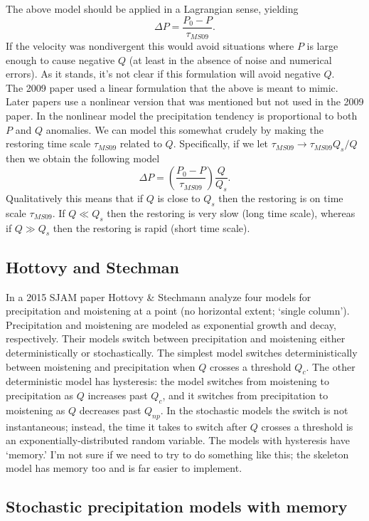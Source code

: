\documentclass[10pt]{article}
\begin{document}
The above model should be applied in a Lagrangian sense, yielding
\[\Delta P = \frac{P_0-P}{\tau_{MS09}}.\]
If the velocity was nondivergent this would avoid situations where $P$ is large enough to cause negative $Q$ (at least in the absence of noise and numerical errors).
As it stands, it's not clear if this formulation will avoid negative $Q$.\\

The 2009 paper used a linear formulation that the above is meant to mimic. 
Later papers use a nonlinear version that was mentioned but not used in the 2009 paper.
In the nonlinear model the precipitation tendency is proportional to both $P$ and $Q$ anomalies.
We can model this somewhat crudely by making the restoring time scale $\tau_{MS09}$ related to $Q$.
Specifically, if we let $\tau_{MS09}\to \tau_{MS09}Q_s/Q$ then we obtain the following model
\[\Delta P = \left(\frac{P_0-P}{\tau_{MS09}}\right)\frac{Q}{Q_s}.\]
Qualitatively this means that if $Q$ is close to $Q_s$ then the restoring is on time scale $\tau_{MS09}$.
If $Q\ll Q_s$ then the restoring is very slow (long time scale), whereas if $Q\gg Q_s$ then the restoring is rapid (short time scale).

\subsection{Hottovy and Stechman}
In a 2015 SJAM paper Hottovy \& Stechmann analyze four models for precipitation and moistening at a point (no horizontal extent; `single column').
Precipitation and moistening are modeled as exponential growth and decay, respectively.
Their models switch between precipitation and moistening either deterministically or stochastically.
The simplest model switches deterministically between moistening and precipitation when $Q$ crosses a threshold $Q_c$.
The other deterministic model has hysteresis: the model switches from moistening to precipitation as $Q$ increases past $Q_c$, and it switches from precipitation to moistening as $Q$ decreases past $Q_{np}$.
In the stochastic models the switch is not instantaneous; instead, the time it takes to switch after $Q$ crosses a threshold is an exponentially-distributed random variable.
The models with hysteresis have `memory.'
I'm not sure if we need to try to do something like this; the skeleton model has memory too and is far easier to implement.

\subsection{Stochastic precipitation models with memory}



\clearpage


\end{document}
